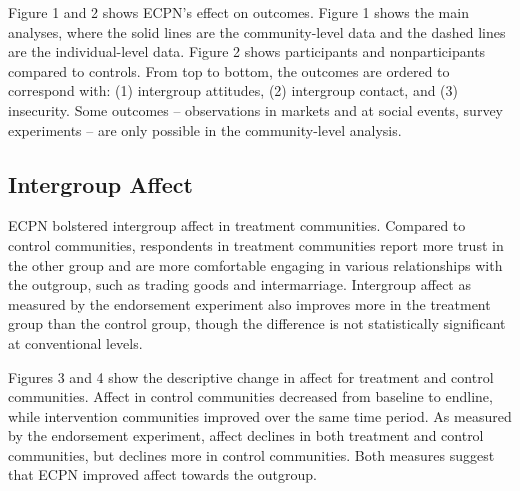 \documentclass[11pt]{article}
\begin{document}
Figure 1 and 2 shows ECPN's effect on outcomes. Figure 1 shows the main
analyses, where the solid lines are the community-level data and the
dashed lines are the individual-level data. Figure 2 shows participants
and nonparticipants compared to controls. From top to bottom, the
outcomes are ordered to correspond with: (1) intergroup attitudes, (2)
intergroup contact, and (3) insecurity. Some outcomes -- observations in
markets and at social events, survey experiments -- are only possible in
the community-level analysis.

\hypertarget{intergroup-affect}{%
\subsection{Intergroup Affect}\label{intergroup-affect}}

ECPN bolstered intergroup affect in treatment communities. Compared to
control communities, respondents in treatment communities report more
trust in the other group and are more comfortable engaging in various
relationships with the outgroup, such as trading goods and
intermarriage. Intergroup affect as measured by the endorsement
experiment also improves more in the treatment group than the control
group, though the difference is not statistically significant at
conventional levels.

Figures 3 and 4 show the descriptive change in affect for treatment and
control communities. Affect in control communities decreased from
baseline to endline, while intervention communities improved over the
same time period. As measured by the endorsement experiment, affect
declines in both treatment and control communities, but declines more in
control communities. Both measures suggest that ECPN improved affect
towards the outgroup.
\end{document}
